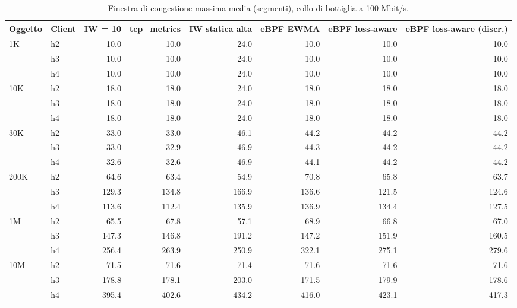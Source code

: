 \begin{table}[htbp]
  \centering
  \caption{Finestra di congestione massima media (segmenti), collo di bottiglia a 100 Mbit/s.}
  \label{tab:cwnd-100}
  \begin{tabular}{llrrrrrr}
    \toprule
    Oggetto & Client & IW = 10 & tcp\_metrics & IW statica alta & eBPF EWMA & eBPF loss-aware & eBPF loss-aware (discr.) \\
    \midrule
    1K & h2 & 10.0 & 10.0 & 24.0 & 10.0 & 10.0 & 10.0 \\
     & h3 & 10.0 & 10.0 & 24.0 & 10.0 & 10.0 & 10.0 \\
     & h4 & 10.0 & 10.0 & 24.0 & 10.0 & 10.0 & 10.0 \\
    \addlinespace
    10K & h2 & 18.0 & 18.0 & 24.0 & 18.0 & 18.0 & 18.0 \\
     & h3 & 18.0 & 18.0 & 24.0 & 18.0 & 18.0 & 18.0 \\
     & h4 & 18.0 & 18.0 & 24.0 & 18.0 & 18.0 & 18.0 \\
    \addlinespace
    30K & h2 & 33.0 & 33.0 & 46.1 & 44.2 & 44.2 & 44.2 \\
     & h3 & 33.0 & 32.9 & 46.9 & 44.3 & 44.2 & 44.2 \\
     & h4 & 32.6 & 32.6 & 46.9 & 44.1 & 44.2 & 44.2 \\
    \addlinespace
    200K & h2 & 64.6 & 63.4 & 54.9 & 70.8 & 65.8 & 63.7 \\
     & h3 & 129.3 & 134.8 & 166.9 & 136.6 & 121.5 & 124.6 \\
     & h4 & 113.6 & 112.4 & 135.9 & 136.9 & 134.4 & 127.5 \\
    \addlinespace
    1M & h2 & 65.5 & 67.8 & 57.1 & 68.9 & 66.8 & 67.0 \\
     & h3 & 147.3 & 146.8 & 191.2 & 147.2 & 151.9 & 160.5 \\
     & h4 & 256.4 & 263.9 & 250.9 & 322.1 & 275.1 & 279.6 \\
    \addlinespace
    10M & h2 & 71.5 & 71.6 & 71.4 & 71.6 & 71.6 & 71.6 \\
     & h3 & 178.8 & 178.1 & 203.0 & 171.5 & 179.9 & 178.6 \\
     & h4 & 395.4 & 402.6 & 434.2 & 416.0 & 423.1 & 417.3 \\
    \bottomrule
  \end{tabular}
\end{table}
